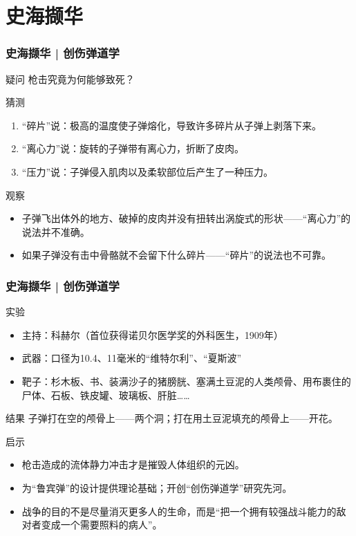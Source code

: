 \section{史海撷华}
\begin{frame}
  \frametitle{史海撷华 | 创伤弹道学}
  \begin{block}{疑问}
    枪击究竟为何能够致死？
  \end{block}
  \pause
  \begin{block}{猜测}
    \begin{enumerate}
      \item “碎片”说：极高的温度使子弹熔化，导致许多碎片从子弹上剥落下来。
      \item “离心力”说：旋转的子弹带有离心力，折断了皮肉。
      \item “压力”说：子弹侵入肌肉以及柔软部位后产生了一种压力。
    \end{enumerate}
  \end{block}
  \pause
  \begin{block}{观察}
    \begin{itemize}
      \item 子弹飞出体外的地方、破掉的皮肉并没有扭转出涡旋式的形状——“离心力”的说法并不准确。
      \item 如果子弹没有击中骨骼就不会留下什么碎片——“碎片”的说法也不可靠。
    \end{itemize}
  \end{block}
\end{frame}

\begin{frame}
  \frametitle{史海撷华 | 创伤弹道学}
  \begin{block}{实验}
    \begin{itemize}
      \item 主持：科赫尔（首位获得诺贝尔医学奖的外科医生，1909年）
      \item 武器：口径为10.4、11毫米的“维特尔利”、“夏斯波”
      \item 靶子：杉木板、书、装满沙子的猪膀胱、塞满土豆泥的人类颅骨、用布裹住的尸体、石板、铁皮罐、玻璃板、肝脏……
    \end{itemize}
  \end{block}
  \vspace{-0.3em}
  \pause
  \begin{block}{结果}
     子弹打在空的颅骨上——两个洞；打在用土豆泥填充的颅骨上——开花。
  \end{block}
  \vspace{-0.3em}
  \pause
  \begin{block}{启示}
    \begin{itemize}
      \item 枪击造成的流体静力冲击才是摧毁人体组织的元凶。
      \item 为“鲁宾弹”的设计提供理论基础；开创“创伤弹道学”研究先河。
      \item 战争的目的不是尽量消灭更多人的生命，而是“把一个拥有较强战斗能力的敌对者变成一个需要照料的病人”。
    \end{itemize}
  \end{block}
\end{frame}

